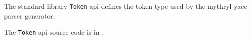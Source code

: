 
The standard library {\tt Token} api defines the token type used by the mythryl-yacc parser generator.

The {\tt Token} api source code is in .





